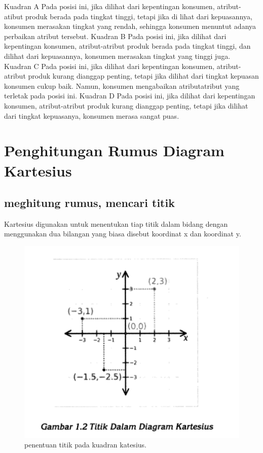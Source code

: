 Kuadran A
Pada posisi ini, jika dilihat dari kepentingan konsumen, atribut-atibut produk berada pada tingkat tinggi, tetapi jika di lihat dari kepuasannya, 
konsumen merasakan tingkat yang rendah, sehingga konsumen menuntut adanya perbaikan atribut tersebut.
Kuadran B
Pada posisi ini, jika dilihat dari kepentingan konsumen, atribut-atribut produk berada pada tingkat tinggi, dan dilihat dari kepuasannya, 
konsumen merasakan tingkat yang tinggi juga.
Kuadran C
Pada posisi ini, jika dilihat dari kepentingan konsumen, atribut-atribut produk kurang dianggap penting, tetapi jika dilihat dari tingkat kepuasan konsumen cukup baik.
Namun, konsumen mengabaikan atributatribut yang terletak pada posisi ini.
Kuadran D
Pada posisi ini, jika dilihat dari kepentingan konsumen, atribut-atribut produk kurang dianggap penting, tetapi jika dilihat dari tingkat kepuasanya, konsumen merasa
sangat puas.


\section{Penghitungan Rumus Diagram Kartesius}
\subsection{meghitung rumus, mencari titik}

Kartesius digunakan untuk menentukan tiap titik dalam bidang dengan menggunakan dua bilangan yang biasa disebut koordinat x dan koordinat y.
\begin{figure}[ht]
	\centerline{\includegraphics[width=1\textwidth]{figures/rahmi9.PNG}}
	\caption{penentuan titik pada kuadran katesius.}
	\label{rahmi9}
	\end{figure}

